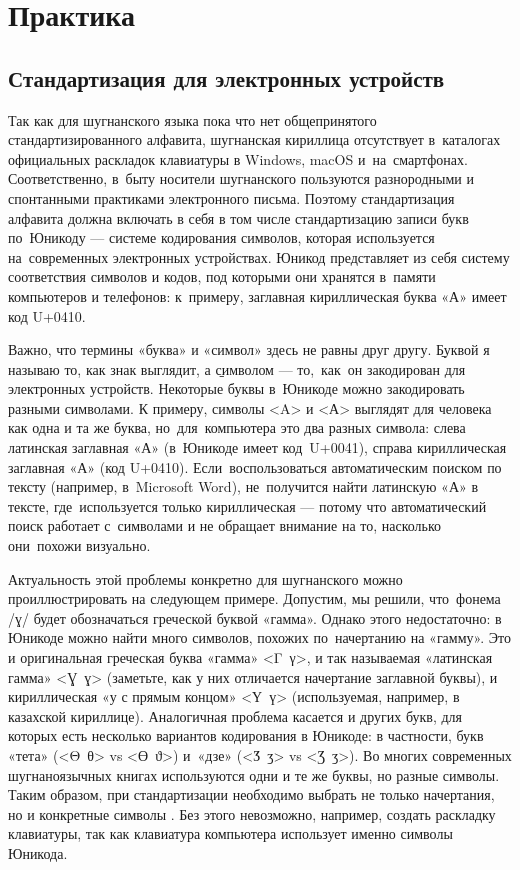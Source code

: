 \section{Практика} \label{ortho-practice}

\subsection{Стандартизация для электронных устройств} \label{ortho-standard}

Так как для шугнанского языка пока что нет общепринятого стандартизированного алфавита, шугнанская кириллица отсутствует в~каталогах официальных раскладок клавиатуры в Windows, macOS и~на~смартфонах. Соответственно, в~быту носители шугнанского пользуются разнородными и спонтанными практиками электронного письма. Поэтому стандартизация алфавита должна включать в себя в том числе стандартизацию записи букв по~Юникоду — системе кодирования символов, которая используется на~современных электронных устройствах. Юникод представляет из себя систему соответствия символов и кодов, под которыми они хранятся в~памяти компьютеров и телефонов: к~примеру, заглавная кириллическая буква «А» имеет код U+0410.

Важно, что термины «буква» и «символ» здесь не равны друг другу. \b{Буквой} я называю то, как знак выглядит, а \b{символом} — то,~как~он закодирован для электронных устройств. Некоторые буквы в~Юникоде можно закодировать разными символами. К примеру, символы <A> и <А> выглядят для человека как одна и та же буква, но~для~компьютера это два разных символа: слева латинская заглавная «А» (в~Юникоде имеет код~U+0041), справа кириллическая заглавная «А» (код U+0410). Если~воспользоваться автоматическим поиском по тексту (например, в~Microsoft Word), не~получится найти латинскую «А» в тексте, где~используется только кириллическая — потому что автоматический поиск работает с~символами и не обращает внимание на то, насколько они~похожи визуально.

Актуальность этой проблемы конкретно для шугнанского можно проиллюстрировать на следующем примере. Допустим, мы решили, что~фонема /ɣ/ будет обозначаться греческой буквой «гамма». Однако этого недостаточно: в Юникоде можно найти много символов, похожих по~начертанию на «гамму». Это и оригинальная греческая буква «гамма» <Γ~γ>, и так называемая «латинская гамма» <Ɣ~ɣ> (заметьте, как у них отличается начертание заглавной буквы), и кириллическая «у с прямым концом» <Ү~ү> (используемая, например, в казахской кириллице). Аналогичная проблема касается и других букв, для которых есть несколько вариантов кодирования в Юникоде: в частности, букв «тета» (<Θ~θ> vs <ϴ~ϑ>) и~«дзе» (<Ӡ~ӡ> vs <Ʒ~ʒ>). Во многих современных шугнаноязычных книгах используются одни и те же буквы, но разные символы. Таким образом, при стандартизации необходимо выбрать не только начертания, но и конкретные символы \parencite[326–328]{lupke2011}. Без этого невозможно, например, создать раскладку клавиатуры, так как клавиатура компьютера использует именно символы Юникода.

